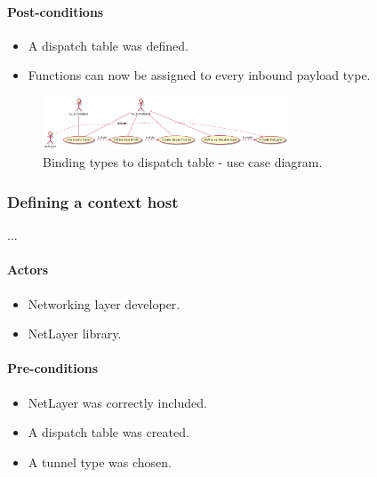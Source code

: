 \documentclass[12pt]{report}
\begin{document}
                    \paragraph{Post-conditions}
                        \begin{itemize}
                            \item A dispatch table was defined.
                            \item Functions can now be assigned to every inbound payload type.
                        \end{itemize}

                    \begin{figure}[H]
                    \caption{Binding types to dispatch table - use case diagram.}
                    \centering
                    \includegraphics[width=0.65\textwidth]{d/uc/bind_types.png}
                    \end{figure}


                \subsubsection{Defining a context host}
                    ...
                    \paragraph{Actors}
                        \begin{itemize}
                            \item Networking layer developer.
                            \item NetLayer library.
                        \end{itemize}

                     \paragraph{Pre-conditions}
                        \begin{itemize}
                            \item NetLayer was correctly included.
                            \item A dispatch table was created.
                            \item A tunnel type was chosen.
                        \end{itemize}
\end{document}
